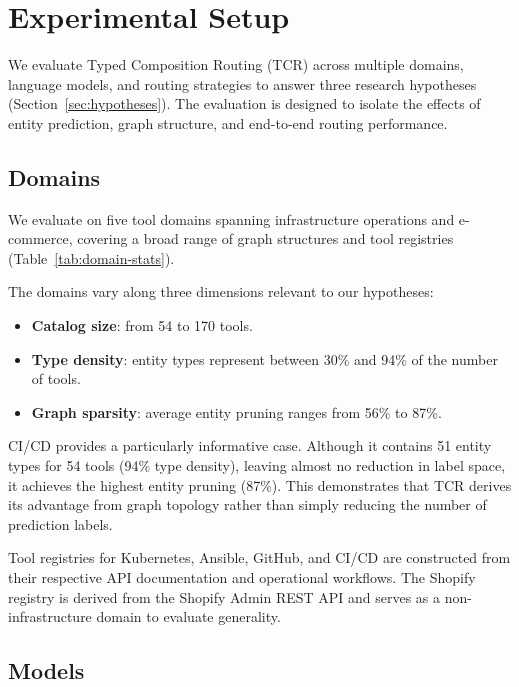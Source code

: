 
\section{Experimental Setup}
\label{sec:experimental-setup}

We evaluate Typed Composition Routing (TCR) across multiple domains, language models, and routing strategies to answer three research hypotheses (Section~\ref{sec:hypotheses}). The evaluation is designed to isolate the effects of entity prediction, graph structure, and end-to-end routing performance.

\subsection{Domains}
\label{sec:domains}

We evaluate on five tool domains spanning infrastructure operations and e-commerce, covering a broad range of graph structures and tool registries (Table~\ref{tab:domain-stats}).



The domains vary along three dimensions relevant to our hypotheses:

\begin{itemize}
    \item \textbf{Catalog size}: from 54 to 170 tools.
    \item \textbf{Type density}: entity types represent between 30\% and 94\% of the number of tools.
    \item \textbf{Graph sparsity}: average entity pruning ranges from 56\% to 87\%.
\end{itemize}

CI/CD provides a particularly informative case.
Although it contains 51 entity types for 54 tools (94\% type density), leaving almost no reduction in label space, it achieves the highest entity pruning (87\%).
This demonstrates that TCR derives its advantage from graph topology rather than simply reducing the number of prediction labels.

Tool registries for Kubernetes, Ansible, GitHub, and CI/CD are constructed from their respective API documentation and operational workflows.
The Shopify registry is derived from the Shopify Admin REST API and serves as a non-infrastructure domain to evaluate generality.

\subsection{Models}
\label{sec:models}

